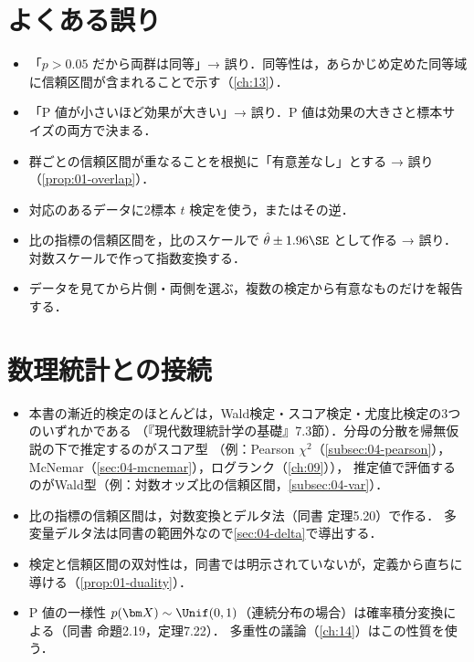 \section{よくある誤り}\label{sec:01-err}
\begin{warnbox}
\begin{itemize}
\item 「$p>0.05$ だから両群は同等」→ 誤り．同等性は，あらかじめ定めた同等域に信頼区間が含まれることで示す（\cref{ch:13}）．
\item 「P 値が小さいほど効果が大きい」→ 誤り．P 値は効果の大きさと標本サイズの両方で決まる．
\item 群ごとの信頼区間が重なることを根拠に「有意差なし」とする → 誤り（\cref{prop:01-overlap}）．
\item 対応のあるデータに2標本 $t$ 検定を使う，またはその逆．
\item 比の指標の信頼区間を，比のスケールで $\hat\theta\pm1.96\SE$ として作る → 誤り．対数スケールで作って指数変換する．
\item データを見てから片側・両側を選ぶ，複数の検定から有意なものだけを報告する．
\end{itemize}
\end{warnbox}

\section{数理統計との接続}\label{sec:01-link}
\begin{linkbox}
\begin{itemize}
\item 本書の漸近的検定のほとんどは，Wald検定・スコア検定・尤度比検定の3つのいずれかである
      （『現代数理統計学の基礎』7.3節）．分母の分散を帰無仮説の下で推定するのがスコア型
      （例：Pearson $\chi^2$（\cref{subsec:04-pearson}），McNemar（\cref{sec:04-mcnemar}），ログランク（\cref{ch:09}）），
      推定値で評価するのがWald型（例：対数オッズ比の信頼区間，\cref{subsec:04-var}）．
\item 比の指標の信頼区間は，対数変換とデルタ法（同書 定理5.20）で作る．
      多変量デルタ法は同書の範囲外なので\cref{sec:04-delta}で導出する．
\item 検定と信頼区間の双対性は，同書では明示されていないが，定義から直ちに導ける（\cref{prop:01-duality}）．
\item P 値の一様性 $p(\bm X)\sim\Unif(0,1)$（連続分布の場合）は確率積分変換による（同書 命題2.19，定理7.22）．
      多重性の議論（\cref{ch:14}）はこの性質を使う．
\end{itemize}
\end{linkbox}

